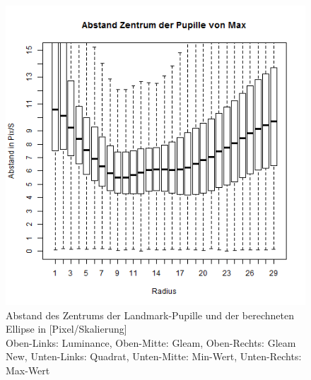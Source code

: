 \begin{figure}
	\includegraphics[width=0.32\linewidth]{Eye_Img_Box/Max_Radius_A}
	\caption{Abstand des Zentrums der Landmark-Pupille und der berechneten Ellipse in [Pixel/Skalierung]\\Oben-Links: Luminance, Oben-Mitte: Gleam, Oben-Rechts: Gleam New, Unten-Links: Quadrat, Unten-Mitte: Min-Wert, Unten-Rechts: Max-Wert}
	\label{ElSe_Gray_Zentrum}
\end{figure}
